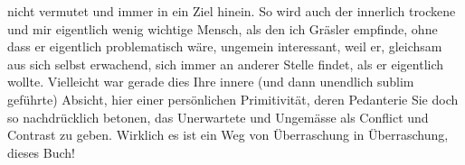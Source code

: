                nicht vermutet und immer in ein Ziel hinein. So wird auch der innerlich trockene und
               mir eigentlich wenig wichtige Mensch, als den ich Gräsler empfinde, ohne dass er eigentlich problematisch
               wäre, ungemein interessant, weil er, gleichsam aus sich selbst erwachend, sich immer
               an anderer Stelle findet, als er eigentlich wollte. Vielleicht war gerade dies Ihre
               innere (und dann unendlich sublim geführte) Absicht, hier einer persönlichen
               Primitivität, deren {\pb}Pedanterie Sie doch
               so nachdrücklich betonen, das Unerwartete und Ungemässe als Conflict und Contrast zu
               geben. Wirklich es ist ein Weg von Überraschung in Überraschung, dieses Buch!\pend
           
